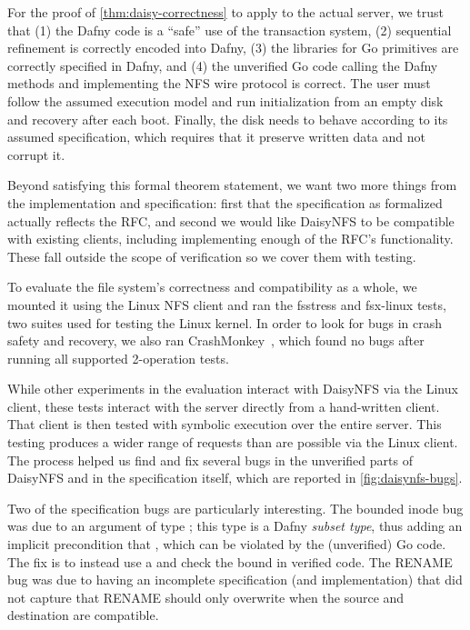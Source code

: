 For the proof of \cref{thm:daisy-correctness} to apply to the actual server, we trust that (1) the
Dafny code is a ``safe'' use of the transaction system, (2) sequential
refinement is correctly encoded into Dafny, (3) the libraries for Go primitives
are correctly specified in Dafny, and (4) the unverified Go code calling the
Dafny methods and implementing the NFS wire protocol is correct. The
user must follow the assumed execution model and run initialization from an
empty disk and recovery after each boot. Finally, the disk needs to behave
according to its assumed specification, which requires that it preserve written
data and not corrupt it.

Beyond satisfying this formal theorem statement, we want two more things from
the implementation and specification: first that the specification as formalized
actually reflects the RFC, and second we would like DaisyNFS to be compatible
with existing clients, including implementing enough of the RFC's functionality.
These fall outside the scope of verification so we cover them with testing.

To evaluate the file system's correctness and compatibility as a whole, we
mounted it using the Linux NFS client and ran the fsstress and fsx-linux tests,
two suites used for testing the Linux kernel. In order to look for bugs in crash
safety and recovery, we also ran CrashMonkey~\cite{mohan:crashmonkey}, which
found no bugs after running all supported 2-operation tests.

While other experiments in the evaluation interact with DaisyNFS via the Linux
client, these tests interact with the server directly from a hand-written
client. That client is then tested with symbolic execution over the entire server.
This testing produces a wider range of requests than are possible via the Linux
client. The process helped us find and fix several bugs in the unverified parts
of DaisyNFS and in the specification itself, which are reported in
\cref{fig:daisynfs-bugs}.

Two of the specification bugs are particularly interesting. The bounded inode bug
was due to an  argument of type ; this type is a Dafny
\emph{subset type}, thus adding an implicit precondition that , which can be violated by the (unverified) Go code. The fix is to instead
use a  and check the bound in verified code. The RENAME bug was due
to having an incomplete specification (and implementation) that did not capture
that RENAME should only overwrite when the source and destination are
compatible.

